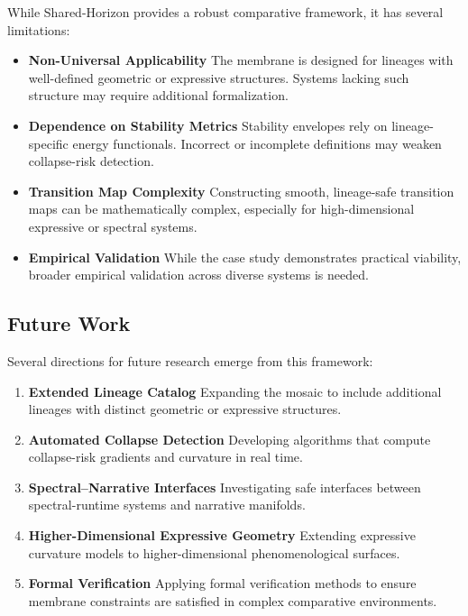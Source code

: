 While Shared-Horizon provides a robust comparative framework, it has several
limitations:

\begin{itemize}
    \item \textbf{Non-Universal Applicability}  
    The membrane is designed for lineages with well-defined geometric or
    expressive structures. Systems lacking such structure may require additional
    formalization.

    \item \textbf{Dependence on Stability Metrics}  
    Stability envelopes rely on lineage-specific energy functionals. Incorrect
    or incomplete definitions may weaken collapse-risk detection.

    \item \textbf{Transition Map Complexity}  
    Constructing smooth, lineage-safe transition maps can be mathematically
    complex, especially for high-dimensional expressive or spectral systems.

    \item \textbf{Empirical Validation}  
    While the case study demonstrates practical viability, broader empirical
    validation across diverse systems is needed.
\end{itemize}

\subsection{Future Work}

Several directions for future research emerge from this framework:

\begin{enumerate}
    \item \textbf{Extended Lineage Catalog}  
    Expanding the mosaic to include additional lineages with distinct geometric
    or expressive structures.

    \item \textbf{Automated Collapse Detection}  
    Developing algorithms that compute collapse-risk gradients and curvature in
    real time.

    \item \textbf{Spectral–Narrative Interfaces}  
    Investigating safe interfaces between spectral-runtime systems and narrative
    manifolds.

    \item \textbf{Higher-Dimensional Expressive Geometry}  
    Extending expressive curvature models to higher-dimensional phenomenological
    surfaces.

    \item \textbf{Formal Verification}  
    Applying formal verification methods to ensure membrane constraints are
    satisfied in complex comparative environments.
\end{enumerate}

